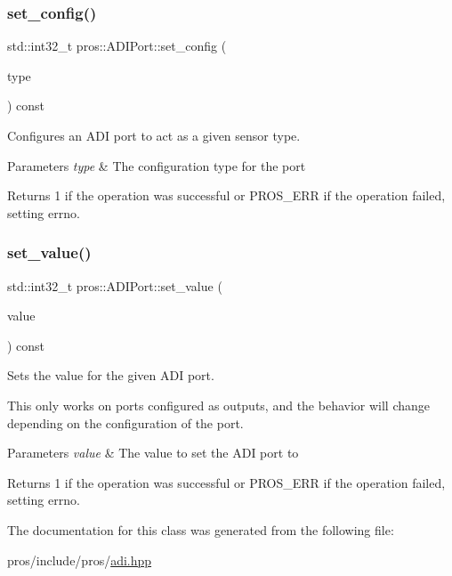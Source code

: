 \subsubsection{\texorpdfstring{set\+\_\+config()}{set\_config()}}
{\footnotesize\ttfamily std\+::int32\+\_\+t pros\+::\+A\+D\+I\+Port\+::set\+\_\+config (\begin{DoxyParamCaption}\item[{\hyperlink{adi_8h_a4efff81399e823764aa05cd5c172ea55}{adi\+\_\+port\+\_\+config\+\_\+e\+\_\+t}}]{type }\end{DoxyParamCaption}) const}



Configures an A\+DI port to act as a given sensor type. 


\begin{DoxyParams}{Parameters}
{\em type} & The configuration type for the port\\
\hline
\end{DoxyParams}
\begin{DoxyReturn}{Returns}
1 if the operation was successful or P\+R\+O\+S\+\_\+\+E\+RR if the operation failed, setting errno. 
\end{DoxyReturn}
\mbox{\label{classpros_1_1ADIPort_ae6711117fbceb3bb6e3602c4ef63aff1}} 
\subsubsection{\texorpdfstring{set\+\_\+value()}{set\_value()}}
{\footnotesize\ttfamily std\+::int32\+\_\+t pros\+::\+A\+D\+I\+Port\+::set\+\_\+value (\begin{DoxyParamCaption}\item[{std\+::int32\+\_\+t}]{value }\end{DoxyParamCaption}) const}



Sets the value for the given A\+DI port. 

This only works on ports configured as outputs, and the behavior will change depending on the configuration of the port.


\begin{DoxyParams}{Parameters}
{\em value} & The value to set the A\+DI port to\\
\hline
\end{DoxyParams}
\begin{DoxyReturn}{Returns}
1 if the operation was successful or P\+R\+O\+S\+\_\+\+E\+RR if the operation failed, setting errno. 
\end{DoxyReturn}


The documentation for this class was generated from the following file\+:\begin{DoxyCompactItemize}
\item 
pros/include/pros/\hyperlink{adi_8hpp}{adi.\+hpp}\end{DoxyCompactItemize}
